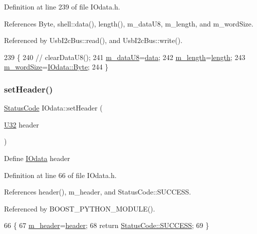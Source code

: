 Definition at line 239 of file I\+Odata.\+h.



References Byte, shell\+::data(), length(), m\+\_\+data\+U8, m\+\_\+length, and m\+\_\+word\+Size.



Referenced by Usb\+I2c\+Bus\+::read(), and Usb\+I2c\+Bus\+::write().


\begin{DoxyCode}
239                                       \{
240 \textcolor{comment}{//    clearDataU8();}
241     \hyperlink{classIOdata_a9c4c0dc5104f7f3b170e30ab78fe61e7}{m\_dataU8}=\hyperlink{namespaceshell_a5ea2525995cedc3efd69ea8a7f034d1e}{data};
242     \hyperlink{classIOdata_afabe57441da019eb614d277799106aac}{m\_length}=\hyperlink{classIOdata_abb40e71ce0290832a24857b4a1e7b1a3}{length};
243     \hyperlink{classIOdata_a719b0ce607ada4fa91b12d6ecfa1b4c9}{m\_wordSize}=\hyperlink{classIOdata_a37c53ebf4bf8d866aac8af572962a84ca00156611f08eeb1b5d361de809dafb8e}{IOdata::Byte};
244   \}
\end{DoxyCode}
\mbox{\label{classIOdata_a9a850f401542d416adf061e30f7dfdd5}} 
\subsubsection{\texorpdfstring{set\+Header()}{setHeader()}}
{\footnotesize\ttfamily \hyperlink{classStatusCode}{Status\+Code} I\+Odata\+::set\+Header (\begin{DoxyParamCaption}\item[{\hyperlink{classIOdata_a96fb57f5fcd87b708743abd3c86a5198}{U32}}]{header }\end{DoxyParamCaption})\hspace{0.3cm}{\ttfamily [inline]}}

Define \hyperlink{classIOdata}{I\+Odata} header 

Definition at line 66 of file I\+Odata.\+h.



References header(), m\+\_\+header, and Status\+Code\+::\+S\+U\+C\+C\+E\+SS.



Referenced by B\+O\+O\+S\+T\+\_\+\+P\+Y\+T\+H\+O\+N\+\_\+\+M\+O\+D\+U\+L\+E().


\begin{DoxyCode}
66                                   \{
67     \hyperlink{classIOdata_a46ec7dbfa257c02be1d39c4799f157d3}{m\_header}=\hyperlink{classIOdata_a503396d8deb6e098c15f963e4201e01b}{header};
68     \textcolor{keywordflow}{return} \hyperlink{classStatusCode_a6f565cbeadc76d14c72f047e5e85eb4badd0da38d3ba0d922efd1f4619bc37ad8}{StatusCode::SUCCESS};
69   \}
\end{DoxyCode}
\mbox{\label{classIOdata_affaf98e7f9e596263e914b055f8f93c2}} 
